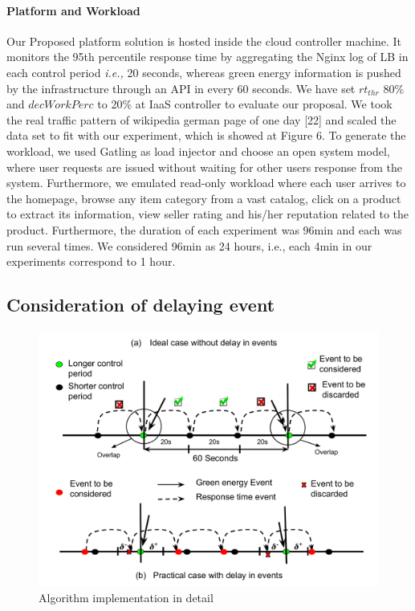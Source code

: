 \paragraph*{\textbf{Platform and Workload}} Our Proposed platform solution is hosted inside the cloud controller
machine. It monitors the 95th percentile response
time by aggregating the Nginx log of LB in each control period \emph{i.e.,} 20 seconds, whereas green energy
information is pushed by the infrastructure through an API in every 60 seconds. We have set $rt_{thr}$ 80\% and $decWorkPerc$ to 20\% at IaaS controller to evaluate our proposal.
We took the real traffic pattern of wikipedia german page of one day [22] and scaled the data set to fit with our experiment,
which is showed at Figure 6. To generate the workload, we used Gatling as load injector and choose an
open system model, where user requests are issued without
waiting for other users response from the system. Furthermore,
we emulated read-only workload where each user arrives to the homepage, browse any item category from a
vast catalog, click on a product to extract its information,
view seller rating and his/her reputation related to the
product. Furthermore, the duration
of each experiment was 96min and each was run several
times. We considered 96min as 24 hours, i.e., each 4min in
our experiments correspond to 1 hour.


\subsection{Consideration of delaying event}

\begin{figure} [htb]
\includegraphics[scale=.35]{Graphs/implementation_UCC.pdf}
\caption{Algorithm implementation in detail}
\label{fig:implementation} 
\end{figure}

